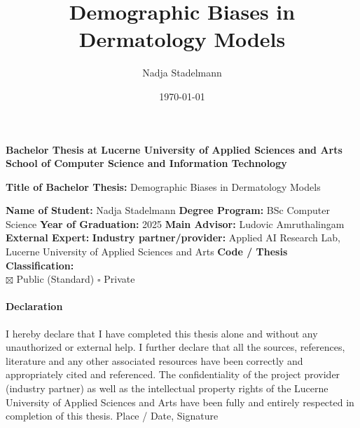 \documentclass[a4paper,10.5pt,
			   bindingoffset=0.2in,left=3.35cm,right=2.12cm,top=3.75cm,bottom=2.88cm,%
				footskip=.25in
				listof=numbered,toc=chapterentrywithdots]{scrreport}
\title{Demographic Biases in Dermatology Models}
\author{Nadja Stadelmann}
\date{\today}
\begin{document}
	\maketitle
	
	
	\fontsize{12}{14}
	\noindent\textbf{Bachelor Thesis at Lucerne University of Applied Sciences and Arts
		School of Computer Science and Information Technology} \\ \vspace*{0.6cm}
	
	\fontsize{10.5}{12}
	\noindent
	\textbf{Title of Bachelor Thesis:} Demographic Biases in Dermatology Models\\ \vspace*{0.2cm}
	
	\noindent
	\textbf{Name of Student:} Nadja Stadelmann\newline \newline
	\textbf{Degree Program:} BSc Computer Science \newline \newline
	\textbf{Year of Graduation:} 2025\newline \newline
	\textbf{Main Advisor:} Ludovic Amruthalingam\newline \newline
	\textbf{External Expert:} \newline \newline
	\textbf{Industry partner/provider:} Applied AI Research Lab, Lucerne University of Applied Sciences and Arts\newline \newline \newline
	\textbf{Code / Thesis Classification:}\\
	$\boxtimes$ Public (Standard) \newline
	$\square$ Private
	
	
	\paragraph{\textbf{Declaration}}
	I hereby declare that I have completed this thesis alone and without any unauthorized or external help. I further declare that all the sources, references, literature and any other associated resources have been correctly and appropriately cited and referenced. The confidentiality of the project provider (industry partner) as well as the intellectual property rights of the Lucerne University of Applied Sciences and Arts have been fully and entirely respected in completion of this thesis. \newline \newline
	Place / Date, Signature	\underline{\hspace*{8cm}} \newline \newline
	
\end{document}
